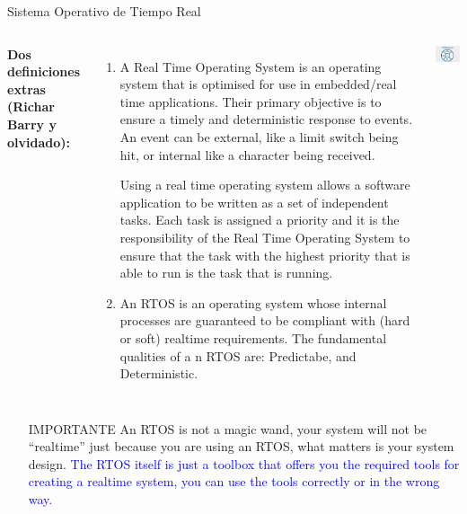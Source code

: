 \documentclass[8pt,aspectratio=169,compress]{beamer}
\begin{document}
\begin{frame}{Sistema Operativo de Tiempo Real}

   \begin{columns}[onlytextwidth,T]
     \column{\dimexpr\linewidth-30mm-5mm}

\textbf{Dos definiciones extras (Richar Barry y olvidado):}

\begin{enumerate}

\item  A Real Time Operating System is an operating system that is optimised for use in embedded/real time applications. Their primary objective is to ensure a timely and deterministic response to events. An event can be external, like a limit switch being hit, or internal like a character being received. 
\bigskip

Using a real time operating system allows a software application to be written as a set of independent tasks. Each task is assigned a priority and it is the responsibility of the Real Time Operating System to ensure that the task with the highest priority that is able to run is the task that is running. 

\bigskip
\item An RTOS is an operating system whose internal processes are guaranteed to be compliant with (hard or soft) realtime requirements. The fundamental qualities of a n RTOS are: Predictabe, and Deterministic.

\end{enumerate}

      \column{40mm}
    \includegraphics[width=40mm]{images/rtos.jpg}

    \end{columns}

\begin{itemize}
  \item[IMPORTANTE] An RTOS is not a magic wand, your system will not be “realtime” just because you are using an RTOS, what matters is your system design. 
\textcolor{blue}{The RTOS itself is just a toolbox that offers you the required tools for creating a realtime system, you can use the tools correctly or in the wrong way.}
\end{itemize}

\end{frame}
\end{document}
